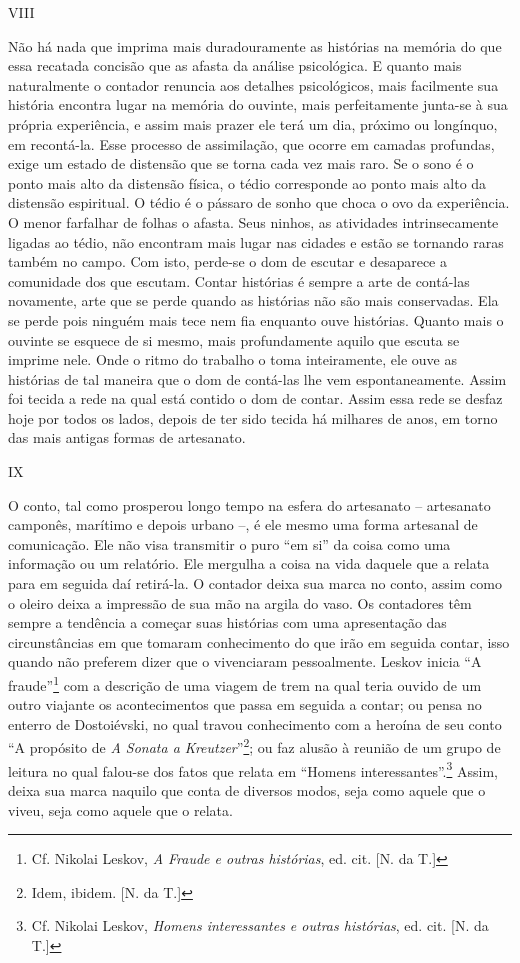 VIII

Não há nada que imprima mais duradouramente as histórias na memória do
que essa recatada concisão que as afasta da análise psicológica. E
quanto mais naturalmente o contador renuncia aos detalhes psicológicos,
mais facilmente sua história encontra lugar na memória do ouvinte, mais
perfeitamente junta-se à sua própria experiência, e assim mais prazer
ele terá um dia, próximo ou longínquo, em recontá-la. Esse processo de
assimilação, que ocorre em camadas profundas, exige um estado de
distensão que se torna cada vez mais raro. Se o sono é o ponto mais alto
da distensão física, o tédio corresponde ao ponto mais alto da distensão
espiritual. O tédio é o pássaro de sonho que choca o ovo da experiência.
O menor farfalhar de folhas o afasta. Seus ninhos, as atividades
intrinsecamente ligadas ao tédio, não encontram mais lugar nas cidades e
estão se tornando raras também no campo. Com isto, perde-se o dom de
escutar e desaparece a comunidade dos que escutam. Contar histórias é
sempre a arte de contá-las novamente, arte que se perde quando as
histórias não são mais conservadas. Ela se perde pois ninguém mais tece
nem fia enquanto ouve histórias. Quanto mais o ouvinte se esquece de si
mesmo, mais profundamente aquilo que escuta se imprime nele. Onde o
ritmo do trabalho o toma inteiramente, ele ouve as histórias de tal
maneira que o dom de contá-las lhe vem espontaneamente. Assim foi tecida
a rede na qual está contido o dom de contar. Assim essa rede se desfaz
hoje por todos os lados, depois de ter sido tecida há milhares de anos,
em torno das mais antigas formas de artesanato.

IX

O conto, tal como prosperou longo tempo na esfera do artesanato --
artesanato camponês, marítimo e depois urbano --, é ele mesmo uma forma
artesanal de comunicação. Ele não visa transmitir o puro ``em si'' da
coisa como uma informação ou um relatório. Ele mergulha a coisa na vida
daquele que a relata para em seguida daí retirá-la. O contador deixa sua
marca no conto, assim como o oleiro deixa a impressão de sua mão na
argila do vaso. Os contadores têm sempre a tendência a começar suas
histórias com uma apresentação das circunstâncias em que tomaram
conhecimento do que irão em seguida contar, isso quando não preferem
dizer que o vivenciaram pessoalmente. Leskov inicia ``A
fraude''\footnote{Cf. Nikolai Leskov, \emph{A Fraude e outras
  histórias}, ed. cit. {[}N. da T.{]}} com a descrição de uma viagem de
trem na qual teria ouvido de um outro viajante os acontecimentos que
passa em seguida a contar; ou pensa no enterro de Dostoiévski, no qual
travou conhecimento com a heroína de seu conto ``A propósito de \emph{A
Sonata a Kreutzer}''\footnote{Idem, ibidem. {[}N. da T.{]}}; ou faz
alusão à reunião de um grupo de leitura no qual falou-se dos fatos que
relata em ``Homens interessantes''.\footnote{Cf. Nikolai Leskov,
  \emph{Homens interessantes e outras histórias}, ed. cit. {[}N. da
  T.{]}} Assim, deixa sua marca naquilo que conta de diversos modos,
seja como aquele que o viveu, seja como aquele que o relata.

